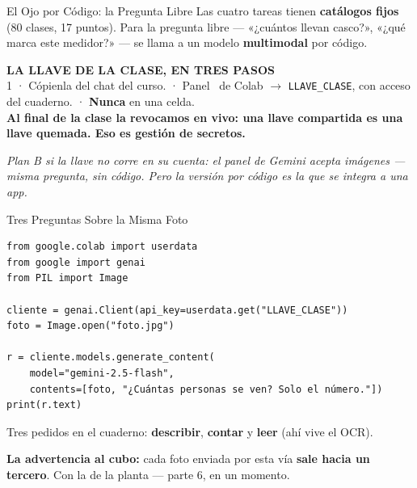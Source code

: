 \documentclass[aspectratio=169, 11pt]{beamer}
\begin{document}
\begin{frame}[shrink=5]{El Ojo por Código: la Pregunta Libre}
  \vspace{2pt}
  {\footnotesize\color{textMuted}
   Las cuatro tareas tienen \textbf{catálogos fijos} (80 clases, 17 puntos).
   Para la pregunta libre --- «¿cuántos llevan casco?», «¿qué marca este
   medidor?» --- se llama a un modelo \textbf{multimodal} por código.}
  \vspace{5pt}
  \begin{tcolorbox}[colback=arcaGray, colframe=arcaRed, boxrule=0pt,
    leftrule=3pt, arc=3pt, left=8pt, right=8pt, top=4pt, bottom=4pt]
    {\scriptsize\color{arcaRed}\bfseries LA LLAVE DE LA CLASE, EN TRES PASOS}\\[2pt]
    {\footnotesize\color{textMuted}
     1 · Cópienla del chat del curso.  · Panel \faKey\ de Colab
     $\to$ \texttt{LLAVE\_CLASE}, con acceso del cuaderno.  ·
     \textbf{Nunca} en una celda.}\\[3pt]
    {\scriptsize\color{arcaDark}\bfseries
     Al final de la clase la revocamos en vivo: una llave compartida es una
     llave quemada. Eso es gestión de secretos.}
  \end{tcolorbox}
  \vspace{5pt}
  {\scriptsize\color{textMuted}\itshape
   Plan B si la llave no corre en su cuenta: el panel de Gemini acepta
   imágenes --- misma pregunta, sin código. Pero la versión por código es la
   que se integra a una app.}
\end{frame}

\begin{frame}[fragile, shrink=5]{Tres Preguntas Sobre la Misma Foto}
  \vspace{-6pt}
  \begin{verbatim}
from google.colab import userdata
from google import genai
from PIL import Image

cliente = genai.Client(api_key=userdata.get("LLAVE_CLASE"))
foto = Image.open("foto.jpg")

r = cliente.models.generate_content(
    model="gemini-2.5-flash",
    contents=[foto, "¿Cuántas personas se ven? Solo el número."])
print(r.text)
  \end{verbatim}
  \vspace{2pt}
  {\scriptsize\color{textMuted}
   Tres pedidos en el cuaderno: \textbf{describir}, \textbf{contar} y
   \textbf{leer} (ahí vive el OCR).}
  \vspace{2pt}
  \begin{tcolorbox}[colback=arcaGray, colframe=arcaRed, boxrule=0pt,
    leftrule=3pt, arc=3pt, left=8pt, right=8pt, top=2pt, bottom=2pt]
    {\scriptsize\color{textMuted}
     \textbf{\color{arcaRed}La advertencia al cubo:} cada foto enviada por
     esta vía \textbf{sale hacia un tercero}. Con la de la planta --- parte
     6, en un momento.}
  \end{tcolorbox}
\end{frame}
\end{document}
